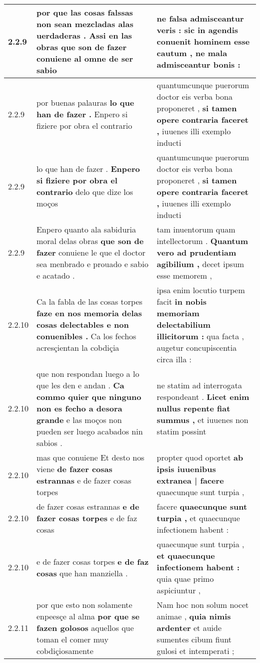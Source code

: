 \begin{tabular}{|p{1cm}|p{6.5cm}|p{6.5cm}|}
2.2.9 & por que las cosas falssas non sean mezcladas alas uerdaderas . \textbf{ Assi en las obras que son de fazer } conuiene al omne de ser sabio & ne falsa admisceantur veris : \textbf{ sic in agendis conuenit hominem esse cautum , } ne mala admisceantur bonis : \\\hline
2.2.9 & por buenas palauras \textbf{ lo que han de fazer . } Enpero si fiziere por obra el contrario & quantumcunque puerorum doctor eis verba bona proponeret , \textbf{ si tamen opere contraria faceret , } iuuenes illi exemplo inducti \\\hline
2.2.9 & lo que han de fazer . \textbf{ Enpero si fiziere por obra el contrario } delo que dize los moços & quantumcunque puerorum doctor eis verba bona proponeret , \textbf{ si tamen opere contraria faceret , } iuuenes illi exemplo inducti \\\hline
2.2.9 & Enpero quanto ala sabiduria moral delas obras \textbf{ que son de fazer } conuiene le que el doctor sea menbrado e prouado e sabio e acatado . & tam inuentorum quam intellectorum . \textbf{ Quantum vero ad prudentiam agibilium , } decet ipsum esse memorem , \\\hline
2.2.10 & Ca la fabla de las cosas torpes \textbf{ faze en nos memoria delas cosas delectables e non conuenibles . } Ca los fechos acresçientan la cobdiçia & ipsa enim locutio turpem facit \textbf{ in nobis memoriam delectabilium illicitorum : } qua facta , augetur concupiscentia circa illa : \\\hline
2.2.10 & que non respondan luego a lo que les den e andan . \textbf{ Ca commo quier que ninguno non es fecho a desora grande } e las moços non pueden ser luego acabados nin sabios . & ne statim ad interrogata respondeant . \textbf{ Licet enim nullus repente fiat summus , } et iuuenes non statim possint \\\hline
2.2.10 & mas que conuiene Et desto nos viene \textbf{ de fazer cosas estrannas } e de fazer cosas torpes & propter quod oportet \textbf{ ab ipsis iuuenibus extranea | facere } quaecunque sunt turpia , \\\hline
2.2.10 & de fazer cosas estrannas \textbf{ e de fazer cosas torpes } e de faz cosas & facere \textbf{ quaecunque sunt turpia , } et quaecunque infectionem habent : \\\hline
2.2.10 & e de fazer cosas torpes \textbf{ e de faz cosas } que han manziella . & quaecunque sunt turpia , \textbf{ et quaecunque infectionem habent : } quia quae primo aspiciuntur , \\\hline
2.2.11 & por que esto non solamente enpeesçe al alma \textbf{ por que se fazen golosos } aquellos que toman el comer muy cobdiçiosamente & Nam hoc non solum nocet animae , \textbf{ quia nimis ardenter } et auide sumentes cibum fiunt gulosi et intemperati ; \\\hline

\end{tabular}
